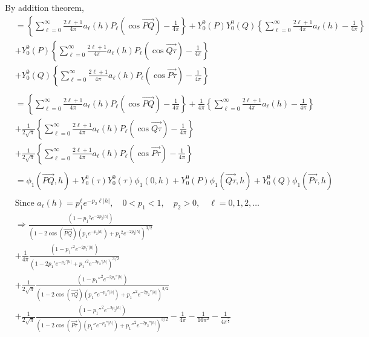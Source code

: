 \documentclass[11pt]{article}
\begin{document}
\begin{itemize}
By addition theorem,\\
\begin{align*}
&= \left\{ \sum_{\ell=0}^\infty \frac{2\ell+1}{4\pi} a_\ell(h) P_\ell(\cos{\overrightarrow{PQ}}) - \frac{1}{4\pi} \right\} + Y_0^0(P)Y_0^0(Q) \left\{ \sum_{\ell=0}^{\infty}  \frac{2\ell+1}{4\pi} a_{\ell}(h) - \frac{1}{4\pi} \right\}\\
&+ Y_0^0(P) \left\{ \sum_{\ell=0}^{\infty}  \frac{2\ell+1}{4\pi} a_{\ell}(h)  P_\ell(\cos{\overrightarrow{Q\tau}}) - \frac{1}{4\pi} \right\}\\ 
&+ Y_0^0(Q) \left\{ \sum_{\ell=0}^{\infty}  \frac{2\ell+1}{4\pi} a_{\ell}(h)  P_\ell(\cos{\overrightarrow{P \tau}}) - \frac{1}{4\pi} \right\}\\
\\
&= \left\{ \sum_{\ell=0}^\infty \frac{2\ell+1}{4\pi} a_\ell(h) P_\ell(\cos{\overrightarrow{PQ}}) - \frac{1}{4\pi} \right\} + \frac{1}{4\pi} \left\{ \sum_{\ell=0}^{\infty}  \frac{2\ell+1}{4\pi} a_{\ell}(h) - \frac{1}{4\pi} \right\}\\
&+ \frac{1}{2\sqrt{\pi}} \left\{ \sum_{\ell=0}^{\infty}  \frac{2\ell+1}{4\pi} a_{\ell}(h)  P_\ell(\cos{\overrightarrow{Q\tau}}) - \frac{1}{4\pi} \right\}\\ 
&+ \frac{1}{2\sqrt{\pi}} \left\{ \sum_{\ell=0}^{\infty}  \frac{2\ell+1}{4\pi} a_{\ell}(h)  P_\ell(\cos{\overrightarrow{P \tau}}) - \frac{1}{4\pi} \right\}\\
\\
&= \phi_1(\overrightarrow{PQ},h) + Y_0^0(\tau) Y_0^0(\tau) \phi_1(0,h) +  Y_0^0(P) \phi_1(\overrightarrow{Q\tau},h)  + Y_0^0(Q) \phi_1(\overrightarrow{P\tau},h)\\
\\
&\text{Since } a_\ell(h)=p_1^\ell e^{-p_2 \ell |h|}, \quad 0<p_1<1, \quad p_2>0, \quad \ell=0,1,2,\dots\\
&\Rightarrow \frac{(1 - {p_1}^2 e^{-2 p_2 \lvert h \lvert})}{(1-2 \cos{(\overrightarrow{PQ})} (p_1 e^{-p_2 \lvert h \lvert}) + {p_1}^2 e^{-2p_2 \lvert h \lvert})^{3/2}}\\
&+ \frac{1}{4\pi}\frac{(1 - {p_1'}^2 e^{-2 p_2' \lvert h \lvert})}{(1-2 p_1' e^{-p_2' \lvert h \lvert} + {p_1'}^2 e^{-2p_2' \lvert h \lvert})^{3/2}}\\ 
&+ \frac{1}{2\sqrt{\pi}}\frac{(1 - {p_1''}^2 e^{-2 p_2'' \lvert h \lvert})}{(1-2 \cos{(\overrightarrow{\tau Q})} (p_1'' e^{-p_2'' \lvert h \lvert}) + {p_1''}^2 e^{-2p_2'' \lvert h \lvert})^{3/2}}\\
& + \frac{1}{2\sqrt{\pi}} \frac{(1 - {p_1''}^2 e^{-2 p_2 \lvert h \lvert})}{(1-2 \cos{(\overrightarrow{P \tau})} (p_1'' e^{-p_2'' \lvert h \lvert}) + {p_1''}^2 e^{-2p_2'' \lvert h \lvert})^{3/2}} -  \frac{1}{4\pi} - \frac{1}{16\pi^2} - \frac{1}{4\pi^\frac{3}{2}}\\
\end{align*}


\end{itemize}
\end{document}
